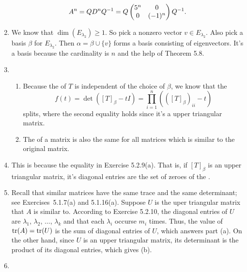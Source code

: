 \begin{enumerate}
\[A^n=QD^nQ^{-1}=Q\begin{pmatrix}5^n & 0\cr 0 & (-1)^n\end{pmatrix}Q^{-1}.\]
\item We know that $\dim(E_{\lambda_2})\geq 1$. So pick a nonzero vector $v\in E_{\lambda_2}$. Also pick a basis $\beta $ for $E_{\lambda_2}$. Then $\alpha=\beta\cup \{v\}$ forms a basis consisting of eigenvectors. It's a basis because the cardinality is $n$ and the help of Theorem 5.8.
\item \begin{enumerate}
\item Because the \charpoly{} of $T$ is independent of the choice of $\beta $, we know that the \charpoly{} 
\[f(t)=\det([T]_{\beta}-tI)=\prod_{i=1}^n{(([T]_{\beta})_{ii}-t)}\]
splits, where the second equality holds since it's a upper triangular matrix.
\item The \charpoly{} of a matrix is also the same for all matrices which is similar to the original matrix.
\end{enumerate}
\item This is because the equality in Exercise 5.2.9(a). That is, if $[T]_{\beta }$ is an upper triangular matrix, it's diagonal entries are the set of zeroes of the \charpoly{}.
\item Recall that similar matrices have the same trace and the same determinant; see Exercises~5.1.7(a) and 5.1.16(a).  Suppose $U$ is the uper triangular matrix that $A$ is similar to.  According to Exercise 5.2.10, the diagonal entries of $U$ are $\lambda_1$, $\lambda_2$, $\ldots$, $\lambda_k$ and that each $\lambda_i$ occurse $m_i$ times.  Thus, the value of $\operatorname{tr}(A) = \operatorname{tr}(U)$ is the sum of diagonal entries of $U$, which answers part (a).  On the other hand, since $U$ is an upper triangular matrix, its determinant is the product of its diagonal entries, which gives (b).
\item \begin{enumerate}

\end{enumerate}
\end{enumerate}
